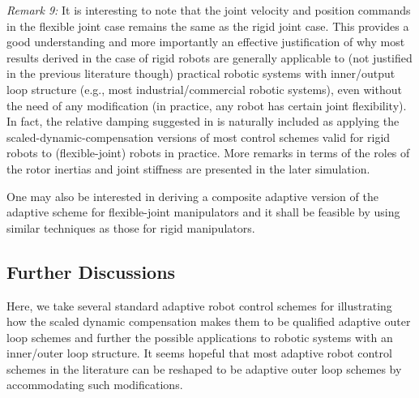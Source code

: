\documentclass[9pt,technote]{IEEEtran}
\begin{document}
{\emph{Remark 9:} It is interesting to note that the joint velocity and position commands in the flexible joint case remains the same as the rigid joint case. This provides a good understanding and more importantly an effective justification of why most results derived in the case of rigid robots are generally applicable to (not justified in the previous literature though) practical robotic systems with inner/output loop structure (e.g., most industrial/commercial robotic systems), even without the need of any modification (in practice, any robot has certain joint flexibility). In fact, the relative damping suggested in \cite{Spong1989_SCL} is naturally included as applying the scaled-dynamic-compensation versions of most control schemes valid for rigid robots to (flexible-joint) robots in practice. More remarks in terms of the roles of the rotor inertias and joint stiffness are presented in the later simulation.


One may also be interested in deriving a composite adaptive version of the adaptive scheme for flexible-joint manipulators and it shall be feasible by using similar techniques as those for rigid manipulators.

\subsection{Further Discussions}

Here, we take several standard adaptive robot control schemes for illustrating how the scaled dynamic compensation makes them to be qualified adaptive outer loop schemes and further the possible applications to robotic systems with an inner/outer loop structure. It seems hopeful that most adaptive robot control schemes in the literature can be reshaped to be adaptive outer loop schemes by accommodating such modifications.

}
\end{document}
